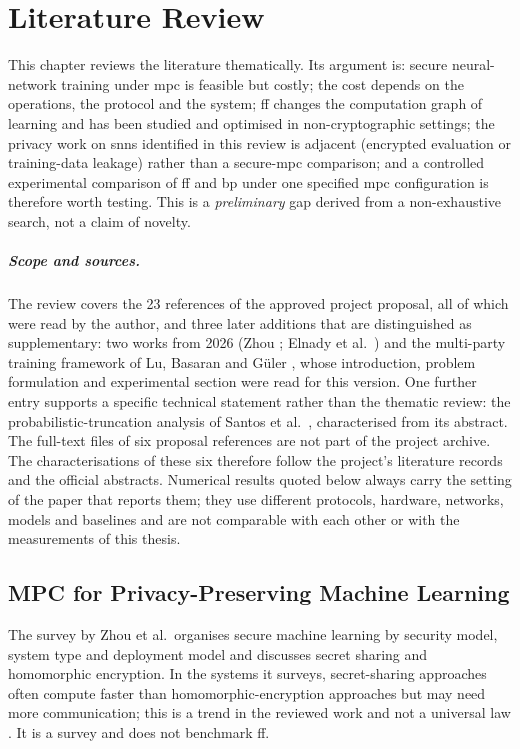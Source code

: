 \chapter{Literature Review}\label{chap:litreview}

This chapter reviews the literature thematically. Its argument is: secure neural-network training under \ac{mpc} is feasible but costly; the cost depends on the operations, the protocol and the system; \ac{ff} changes the computation graph of learning and has been studied and optimised in non-cryptographic settings; the privacy work on \acp{snn} identified in this review is adjacent (encrypted evaluation or training-data leakage) rather than a secure-\ac{mpc} comparison; and a controlled experimental comparison of \ac{ff} and \ac{bp} under one specified \ac{mpc} configuration is therefore worth testing. This is a \emph{preliminary} gap derived from a non-exhaustive search, not a claim of novelty.

\paragraph{Scope and sources.} The review covers the 23 references of the approved project proposal, all of which were read by the author, and three later additions that are distinguished as supplementary: two works from 2026 (Zhou \cite{zhou2026rmfe}; Elnady et al.\ \cite{elnady2026ff}) and the multi-party training framework of Lu, Basaran and G\"uler \cite{lu2024clover}, whose introduction, problem formulation and experimental section were read for this version. One further entry supports a specific technical statement rather than the thematic review: the probabilistic-truncation analysis of Santos et al.\ \cite{santos2024curl}, characterised from its abstract. The full-text files of six proposal references \cite{keller2023note,luo2026secptuning,yan2025comet,feng2025fwdp,nikfam2025spyking,kim2022privatesnn} are not part of the project archive. The characterisations of these six therefore follow the project's literature records and the official abstracts. Numerical results quoted below always carry the setting of the paper that reports them; they use different protocols, hardware, networks, models and baselines and are not comparable with each other or with the measurements of this thesis.

\section{MPC for Privacy-Preserving Machine Learning}\label{sec:lr-mpc}
The survey by Zhou et al.\ organises secure machine learning by security model, system type and deployment model and discusses secret sharing and homomorphic encryption. In the systems it surveys, secret-sharing approaches often compute faster than homomorphic-encryption approaches but may need more communication; this is a trend in the reviewed work and not a universal law \cite{zhou2024smpc}. It is a survey and does not benchmark \ac{ff}.

